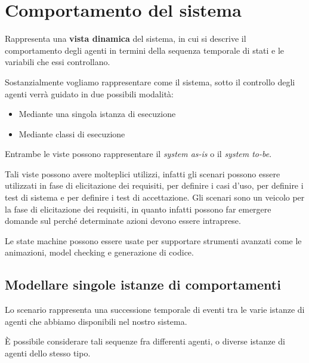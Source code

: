 \chapter{Comportamento del sistema}
Rappresenta una \textbf{vista dinamica} del sistema, in cui si descrive il comportamento
degli agenti in termini della sequenza temporale di stati e le variabili che essi 
controllano.

Sostanzialmente vogliamo rappresentare come il sistema, sotto il controllo degli agenti 
verrà guidato in due possibili modalità:
\begin{itemize}
    \item Mediante una singola istanza di esecuzione
    \item Mediante classi di esecuzione
\end{itemize}
Entrambe le viste possono rappresentare il \textit{system as-is} o il \textit{system to-be}.

Tali viste possono avere molteplici utilizzi, infatti gli scenari possono essere
utilizzati in fase di elicitazione dei requisiti, per definire i casi d'uso, per
definire i test di sistema e per definire i test di accettazione.
Gli scenari sono un veicolo per la fase di elicitazione dei requisiti, in quanto
infatti possono far emergere domande sul perché determinate 
azioni devono essere intraprese.

Le state machine possono essere usate per supportare strumenti avanzati come le 
animazioni, model checking e generazione di codice.
\section{Modellare singole istanze di comportamenti}
\begin{tcolorbox}[colback=lime!5!white,colframe=lime!75!black, title=Scenario]
    Lo scenario rappresenta una successione temporale di eventi tra le varie istanze di 
    agenti che abbiamo disponibili nel nostro sistema.
\end{tcolorbox}
È possibile considerare tali sequenze fra differenti agenti, o diverse istanze di 
agenti dello stesso tipo.

